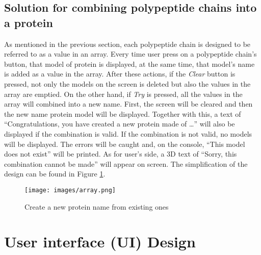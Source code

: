 \subsection{Solution for combining polypeptide chains into a protein}
As mentioned in the previous section, each polypeptide chain is designed to be referred to as a value in an array. Every time user press on a polypeptide chain’s button, that model of protein is displayed, at the same time, that model’s name is added as a value in the array. After these actions, if the \emph{Clear} button is pressed, not only the models on the screen is deleted but also the values in the array are emptied. On the other hand, if \emph{Try} is pressed, all the values in the array will combined into a new name. First, the screen will be cleared and then the new name protein model will be displayed. Together with this, a text of “Congratulations, you have created a new protein made of …” will also be displayed if the combination is valid. If the combination is not valid, no models will be displayed. The errors will be caught and, on the console, “This model does not exist” will be printed. As for user’s side, a 3D text of “Sorry, this combination cannot be made” will appear on screen. The simplification of the design can be found in Figure \ref{fig:array}.
\begin{figure}[!htp]
	\centering
	\texttt{[image: images/array.png]}
	\caption{Create a new protein name from existing ones}
	\label{fig:array}
\end{figure}


\section{User interface (UI) Design}
